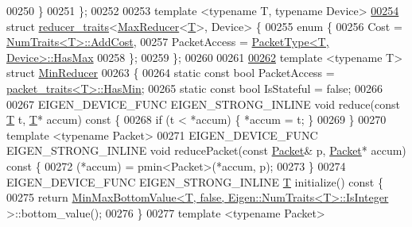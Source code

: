 \begin{DoxyCode}
00250   \}
00251 \};
00252 
00253 \textcolor{keyword}{template} <\textcolor{keyword}{typename} T, \textcolor{keyword}{typename} Device>
\hyperlink{struct_eigen_1_1internal_1_1reducer__traits_3_01_max_reducer_3_01_t_01_4_00_01_device_01_4}{00254} \textcolor{keyword}{struct }\hyperlink{struct_eigen_1_1internal_1_1reducer__traits}{reducer\_traits}<\hyperlink{struct_eigen_1_1internal_1_1_max_reducer}{MaxReducer}<\hyperlink{group___sparse_core___module}{T}>, Device> \{
00255   \textcolor{keyword}{enum} \{
00256     Cost = \hyperlink{group___core___module_struct_eigen_1_1_num_traits}{NumTraits<T>::AddCost},
00257     PacketAccess = \hyperlink{struct_eigen_1_1_packet_type}{PacketType<T, Device>::HasMax}
00258   \};
00259 \};
00260 
00261 
\hyperlink{struct_eigen_1_1internal_1_1_min_reducer}{00262} \textcolor{keyword}{template} <\textcolor{keyword}{typename} T> \textcolor{keyword}{struct }\hyperlink{struct_eigen_1_1internal_1_1_min_reducer}{MinReducer}
00263 \{
00264   \textcolor{keyword}{static} \textcolor{keyword}{const} \textcolor{keywordtype}{bool} PacketAccess = \hyperlink{struct_eigen_1_1internal_1_1packet__traits}{packet\_traits<T>::HasMin};
00265   \textcolor{keyword}{static} \textcolor{keyword}{const} \textcolor{keywordtype}{bool} IsStateful = \textcolor{keyword}{false};
00266 
00267   EIGEN\_DEVICE\_FUNC EIGEN\_STRONG\_INLINE \textcolor{keywordtype}{void} reduce(\textcolor{keyword}{const} \hyperlink{group___sparse_core___module}{T} t, \hyperlink{group___sparse_core___module}{T}* accum)\textcolor{keyword}{ const }\{
00268     \textcolor{keywordflow}{if} (t < *accum) \{ *accum = t; \}
00269   \}
00270   \textcolor{keyword}{template} <\textcolor{keyword}{typename} Packet>
00271   EIGEN\_DEVICE\_FUNC EIGEN\_STRONG\_INLINE \textcolor{keywordtype}{void} reducePacket(\textcolor{keyword}{const} \hyperlink{union_eigen_1_1internal_1_1_packet}{Packet}& p, 
      \hyperlink{union_eigen_1_1internal_1_1_packet}{Packet}* accum)\textcolor{keyword}{ const }\{
00272     (*accum) = pmin<Packet>(*accum, p);
00273   \}
00274   EIGEN\_DEVICE\_FUNC EIGEN\_STRONG\_INLINE \hyperlink{group___sparse_core___module}{T} initialize()\textcolor{keyword}{ const }\{
00275     \textcolor{keywordflow}{return} \hyperlink{struct_eigen_1_1internal_1_1_min_max_bottom_value}{MinMaxBottomValue<T, false, Eigen::NumTraits<T>::IsInteger}
      >::bottom\_value();
00276   \}
00277   \textcolor{keyword}{template} <\textcolor{keyword}{typename} Packet>

\end{DoxyCode}
